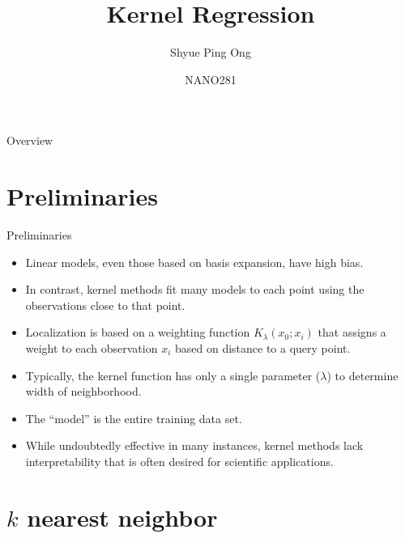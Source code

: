 \documentclass{beamer}
\title[Kernel Regression]{Kernel Regression}
\author{Shyue Ping Ong}
\institute[UCSD]{University of California, San Diego\\
\medskip
}
\date{NANO281} %
\begin{document}
\begin{frame}
    \titlepage %
\end{frame}


\begin{frame}{Overview}
    \tableofcontents
\end{frame}


\section{Preliminaries}

\begin{frame}{Preliminaries}
    \begin{itemize}
        \item Linear models, even those based on basis expansion, have high bias.
        \item In contrast, kernel methods fit many models to each point using the observations close to that point.
        \item Localization is based on a weighting function $K_{\lambda}(x_0; x_i)$ that assigns a weight to each observation $x_i$ based on distance to a query point.
        \item Typically, the kernel function has only a single parameter ($\lambda$) to determine width of neighborhood.
        \item The ``model'' is the entire training data set.
        \item While undoubtedly effective in many instances, kernel methods lack interpretability that is often desired for scientific applications.
    \end{itemize}
\end{frame}

\section{$k$ nearest neighbor}
\end{document}
